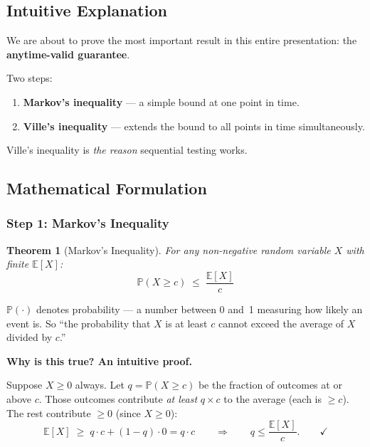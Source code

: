 \documentclass[12pt, a4paper]{article}
\newtheorem{theorem}{Theorem}
\newcommand{\E}{\mathbb{E}}            %
\newcommand{\Prob}{\mathbb{P}}         %
\begin{document}
\subsection{Intuitive Explanation}

\begin{intuition}
We are about to prove the most important result in this entire presentation:
the \textbf{anytime-valid guarantee}.

Two steps:
\begin{enumerate}[nosep]
  \item \textbf{Markov's inequality} --- a simple bound at one point in time.
  \item \textbf{Ville's inequality} --- extends the bound to all points in
        time simultaneously.
\end{enumerate}
Ville's inequality is \emph{the reason} sequential testing works.
\end{intuition}

\subsection{Mathematical Formulation}

\subsubsection*{Step 1: Markov's Inequality}

\begin{theorem}[Markov's Inequality]
For any non-negative random variable $X$ with finite $\E[X]$:
\[
  \boxed{\Prob(X \geq c) \;\leq\; \frac{\E[X]}{c}}
\]
\end{theorem}

\begin{plainlanguage}
$\Prob(\cdot)$ denotes probability --- a number between 0 and~1 measuring how
likely an event is.  So ``the probability that $X$ is at least $c$ cannot
exceed the average of $X$ divided by $c$.''
\end{plainlanguage}

\textbf{Why is this true?  An intuitive proof.}

Suppose $X \geq 0$ always.  Let $q = \Prob(X \geq c)$ be the fraction of
outcomes at or above $c$.  Those outcomes contribute \emph{at least}
$q \times c$ to the average (each is $\geq c$).  The rest contribute $\geq 0$
(since $X \geq 0$):
\[
  \E[X] \;\geq\; q \cdot c + (1-q)\cdot 0 = q \cdot c
  \qquad\Longrightarrow\qquad
  q \leq \frac{\E[X]}{c}. \qquad\checkmark
\]
\end{document}
